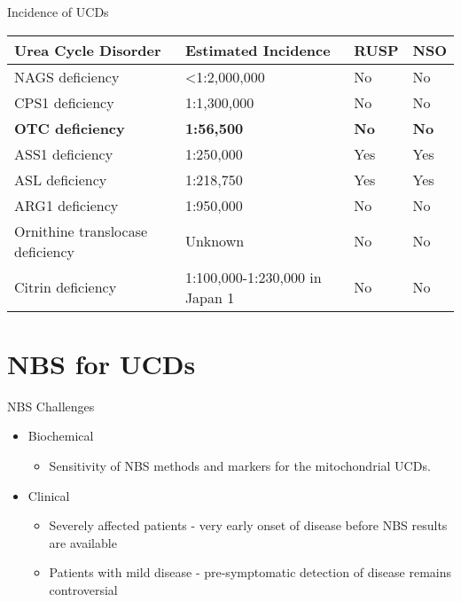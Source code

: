 \documentclass[presentation, smaller]{beamer}
\begin{document}
\begin{frame}[label={sec:orgheadline6}]{Incidence of UCDs}
\begin{center}
\begin{tabular}{llll}
Urea Cycle Disorder & Estimated Incidence & RUSP & NSO\\
\hline
NAGS deficiency & <1:2,000,000 & No & No\\
CPS1 deficiency & 1:1,300,000 & No & No\\
\textbf{OTC deficiency} & \textbf{1:56,500} & \textbf{No} & \textbf{No}\\
ASS1 deficiency & 1:250,000 & Yes & Yes\\
ASL deficiency & 1:218,750 & Yes & Yes\\
ARG1 deficiency & 1:950,000 & No & No\\
Ornithine translocase deficiency & Unknown & No & No\\
Citrin deficiency & 1:100,000-1:230,000 in Japan 1 & No & No\\
\end{tabular}
\end{center}
\end{frame}

\section{NBS for UCDs}
\label{sec:orgheadline18}
\begin{frame}[label={sec:orgheadline8}]{NBS Challenges}
\begin{itemize}
\item Biochemical 
\begin{itemize}
\item Sensitivity of NBS methods and markers for the mitochondrial UCDs.
\end{itemize}
\item Clinical 
\begin{itemize}
\item Severely affected patients - very early onset of disease before NBS results are available
\item Patients with mild disease - pre-symptomatic detection of disease remains controversial
\end{itemize}
\end{itemize}
\end{frame}
\end{document}
